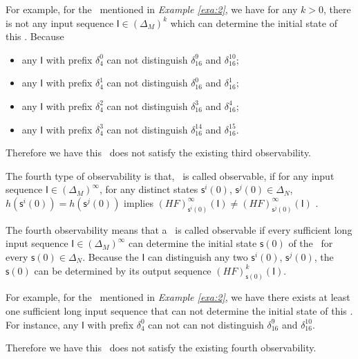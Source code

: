 \begin{example}
For example, for the \BCN\ mentioned in {\em Example \ref{exa:2}}, we have for any $k>0$, there is not any input sequence $\mathsf{I}\in(\Delta_M)^k$ which can determine the initial state of this \BCN. Because 
\begin{itemize}
  \item any $\mathsf{I}$ with prefix $\delta_{4}^0$ can not distinguish $\delta_{16}^9$ and $\delta_{16}^{10}$;
  \item any $\mathsf{I}$ with prefix $\delta_{4}^1$ can not distinguish $\delta_{16}^0$ and $\delta_{16}^{1}$;
  \item any $\mathsf{I}$ with prefix $\delta_{4}^2$ can not distinguish $\delta_{16}^3$ and $\delta_{16}^{4}$;
  \item any $\mathsf{I}$ with prefix $\delta_{4}^3$ can not distinguish $\delta_{16}^{14}$ and $\delta_{16}^{15}$.
\end{itemize} 



Therefore we have this \BCN\ does not satisfy the existing third observability.
\label{exa:6}
\end{example}  
\begin{definition}
	The fourth type of observability is that, \BCN\ is called observable, if for any input sequence $\mathsf{I}\in(\Delta_M)^{\infty}$, for any distinct states $\mathsf{s}^{i}(0)$, $\mathsf{s}^{j}(0) \in \Delta_N$, $h(\mathsf{s}^{i}(0))=h(\mathsf{s}^{j}(0))$ implies $(HF)^{\infty}_{\mathsf{s}^{i}(0)}(\mathsf{I})\neq (HF)^{\infty}_{\mathsf{s}^{j}(0)}(\mathsf{I})$ \cite{Fornasini2013Observability}.
\end{definition}

The fourth observability means that a \BCN\ is called observable if every sufficient long input sequence $\mathsf{I}\in(\Delta_M)^{\infty}$ can determine the initial state $\mathsf{s}(0)$ of the \BCN\ for every $\mathsf{s}(0)\in\Delta_N$. Because the $\mathsf{I}$ can distinguish any two $\mathsf{s}^{i}(0)$, $\mathsf{s}^{j}(0)$, the $\mathsf{s}(0)$ can be determined by its output sequence $(HF)^k_{\mathsf{s}(0)}(\mathsf{I})$.
\begin{example}
For example, for the \BCN\ mentioned in {\em Example \ref{exa:2}}, we have there exists at least one sufficient long input sequence that can not determine the initial state of this \BCN. For instance, any $\mathsf{I}$ with prefix $\delta_{4}^0$ can not can not distinguish $\delta_{16}^9$ and $\delta_{16}^{10}$. %

Therefore we have this \BCN\ does not satisfy the existing fourth observability.
\label{exa:7}
\end{example}  

